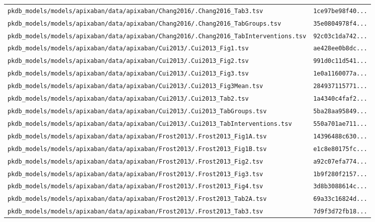 \begin{longtable}{ll}
\texttt{pkdb\_models/models/apixaban/data/apixaban/Chang2016/.Chang2016\_Tab3.tsv} & \texttt{1ce97be98f40...} \\
\texttt{pkdb\_models/models/apixaban/data/apixaban/Chang2016/.Chang2016\_TabGroups.tsv} & \texttt{35e0804978f4...} \\
\texttt{pkdb\_models/models/apixaban/data/apixaban/Chang2016/.Chang2016\_TabInterventions.tsv} & \texttt{92c03c1da742...} \\
\texttt{pkdb\_models/models/apixaban/data/apixaban/Cui2013/.Cui2013\_Fig1.tsv} & \texttt{ae428ee0b8dc...} \\
\texttt{pkdb\_models/models/apixaban/data/apixaban/Cui2013/.Cui2013\_Fig2.tsv} & \texttt{991d0c11d541...} \\
\texttt{pkdb\_models/models/apixaban/data/apixaban/Cui2013/.Cui2013\_Fig3.tsv} & \texttt{1e0a1160077a...} \\
\texttt{pkdb\_models/models/apixaban/data/apixaban/Cui2013/.Cui2013\_Fig3Mean.tsv} & \texttt{284937115771...} \\
\texttt{pkdb\_models/models/apixaban/data/apixaban/Cui2013/.Cui2013\_Tab2.tsv} & \texttt{1a4340c4faf2...} \\
\texttt{pkdb\_models/models/apixaban/data/apixaban/Cui2013/.Cui2013\_TabGroups.tsv} & \texttt{5ba28aa95849...} \\
\texttt{pkdb\_models/models/apixaban/data/apixaban/Cui2013/.Cui2013\_TabInterventions.tsv} & \texttt{550a701ae711...} \\
\texttt{pkdb\_models/models/apixaban/data/apixaban/Frost2013/.Frost2013\_Fig1A.tsv} & \texttt{14396488c630...} \\
\texttt{pkdb\_models/models/apixaban/data/apixaban/Frost2013/.Frost2013\_Fig1B.tsv} & \texttt{e1c8e80175fc...} \\
\texttt{pkdb\_models/models/apixaban/data/apixaban/Frost2013/.Frost2013\_Fig2.tsv} & \texttt{a92c07efa774...} \\
\texttt{pkdb\_models/models/apixaban/data/apixaban/Frost2013/.Frost2013\_Fig3.tsv} & \texttt{1b9f280f2157...} \\
\texttt{pkdb\_models/models/apixaban/data/apixaban/Frost2013/.Frost2013\_Fig4.tsv} & \texttt{3d8b3088614c...} \\
\texttt{pkdb\_models/models/apixaban/data/apixaban/Frost2013/.Frost2013\_Tab2A.tsv} & \texttt{69a33c16824d...} \\
\texttt{pkdb\_models/models/apixaban/data/apixaban/Frost2013/.Frost2013\_Tab3.tsv} & \texttt{7d9f3d72fb18...} \\

\end{longtable}
